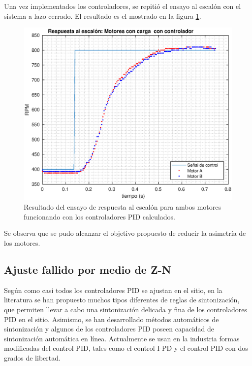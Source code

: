 \documentclass[10pt,conference,a4paper,onecolumn]{article}%
\begin{document}
Una vez implementados los controladores, se repitió el ensayo al escalón con el sistema a lazo cerrado. El resultado es el mostrado en la figura \ref{fig:respEscLazoCerrado}.
\begin{figure}[h]
\centering
\includegraphics[width=15cm]{./imagenes/resp_escalon_motores_controlados_2}
\caption{Resultado del ensayo de respuesta al escalón para ambos motores funcionando con los controladores PID calculados.}
\label{fig:respEscLazoCerrado}
\end{figure}
Se observa que se pudo alcanzar el objetivo propuesto de reducir la asimetría de los motores.

\subsection{Ajuste fallido por medio de Z-N} %

Según \cite{ogata} como casi todos los controladores PID se ajustan en el sitio, en la literatura se han propuesto muchos tipos diferentes de reglas de sintonización, que permiten llevar a cabo una sintonización delicada y fina de los controladores PID en el sitio. Asimismo, se han desarrollado métodos automáticos de sintonización y algunos de los controladores PID poseen capacidad de sintonización automática en línea. Actualmente se usan en la industria formas modificadas del control PID, tales como el control I-PD y el control PID con dos grados de libertad.
\end{document}
